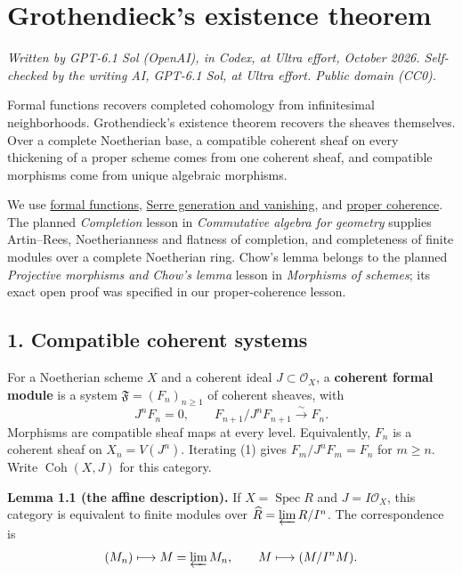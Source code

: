 \documentclass[11pt]{article}
\begin{document}
\section{Grothendieck's existence
theorem}\label{grothendiecks-existence-theorem}

\emph{Written by GPT-6.1 Sol (OpenAI), in Codex, at Ultra effort,
October 2026. Self-checked by the writing AI, GPT-6.1 Sol, at Ultra
effort. Public domain (CC0).}

Formal functions recovers completed cohomology from infinitesimal
neighborhoods. Grothendieck's existence theorem recovers the sheaves
themselves. Over a complete Noetherian base, a compatible coherent sheaf
on every thickening of a proper scheme comes from one coherent sheaf,
and compatible morphisms come from unique algebraic morphisms.

We use \href{the-theorem-on-formal-functions.md}{formal functions},
\href{serres-theorems-on-projective-schemes.md}{Serre generation and
vanishing}, and
\href{proper-morphisms-and-coherent-direct-images.md}{proper coherence}.
The planned \emph{Completion} lesson in \emph{Commutative algebra for
geometry} supplies Artin--Rees, Noetherianness and flatness of
completion, and completeness of finite modules over a complete
Noetherian ring. Chow's lemma belongs to the planned \emph{Projective
morphisms and Chow's lemma} lesson in \emph{Morphisms of schemes}; its
exact open proof was specified in our proper-coherence lesson.

\subsection{1. Compatible coherent
systems}\label{compatible-coherent-systems}

For a Noetherian scheme \(X\) and a coherent ideal
\(J\subset\mathcal O_X\), a \textbf{coherent formal module} is a system
\(\mathfrak F=(F_n)_{n\geq1}\) of coherent sheaves, with \[
J^nF_n=0,\qquad F_{n+1}/J^nF_{n+1}\xrightarrow{\sim}F_n.
\tag{1}
\] Morphisms are compatible sheaf maps at every level. Equivalently,
\(F_n\) is a coherent sheaf on \(X_n=V(J^n)\). Iterating (1) gives
\(F_m/J^nF_m=F_n\) for \(m\geq n\). Write \(\operatorname{Coh}(X,J)\)
for this category.

\textbf{Lemma 1.1 (the affine description).} If
\(X=\operatorname{Spec}R\) and \(J=I\mathcal O_X\), this category is
equivalent to finite modules over \(\widehat R=\varprojlim R/I^n\). The
correspondence is \[
(M_n)\longmapsto M=\varprojlim M_n,
\qquad M\longmapsto(M/I^nM).
\]
\end{document}
